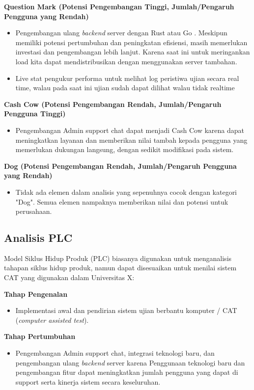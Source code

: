 \documentclass[12pt]{article}
\begin{document}
\textbf{Question Mark (Potensi Pengembangan Tinggi, Jumlah/Pengaruh Pengguna yang Rendah)}
\begin{itemize}

  \item Pengembangan ulang \emph{backend} server dengan Rust atau Go . Meskipun memiliki potensi pertumbuhan dan peningkatan efisiensi, masih memerlukan investasi dan pengembangan lebih lanjut. Karena saat ini untuk meringankan load kita dapat mendistribusikan dengan menggunakan server tambahan.
  \item Live stat pengukur performa untuk melihat log peristiwa ujian secara real time, walau pada saat ini ujian sudah dapat dilihat walau tidak realtime

\end{itemize}

\textbf{Cash Cow (Potensi Pengembangan Rendah, Jumlah/Pengaruh Pengguna Tinggi)}
\begin{itemize}
  \item Pengembangan Admin support chat dapat menjadi Cash Cow karena dapat meningkatkan layanan dan memberikan nilai tambah kepada pengguna yang memerlukan dukungan langsung, dengan sedikit modifikasi pada sistem.

\end{itemize}

\textbf{Dog (Potensi Pengembangan Rendah, Jumlah/Pengaruh Pengguna yang Rendah)}
\begin{itemize}
  \item Tidak ada elemen dalam analisis yang sepenuhnya cocok dengan kategori "Dog". Semua elemen nampaknya memberikan nilai dan potensi untuk perusahaan.
\end{itemize}

\subsection*{Analisis PLC}
Model Siklus Hidup Produk (PLC) biasanya digunakan untuk menganalisis tahapan siklus hidup produk, namun dapat disesuaikan untuk menilai sistem CAT yang digunakan dalam Universitas X:

\textbf{Tahap Pengenalan}
\begin{itemize}
  \item Implementasi awal dan pendirian sistem ujian berbantu komputer / CAT (\emph{computer assisted test}).
\end{itemize}

\textbf{Tahap Pertumbuhan}
\begin{itemize}
  \item Pengembangan Admin support chat, integrasi teknologi baru, dan pengembangan ulang \emph{backend} server karena Penggunaan teknologi baru dan pengembangan fitur dapat meningkatkan jumlah pengguna yang dapat di support serta kinerja sistem secara keseluruhan.
\end{itemize}
\end{document}
